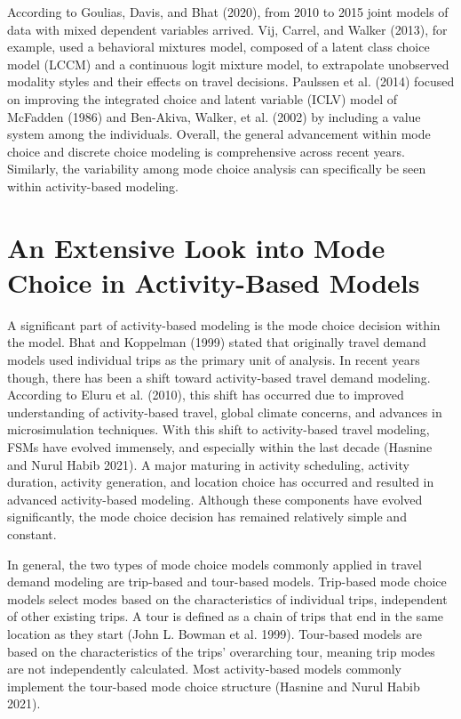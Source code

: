 \documentclass[12pt, oneside, openright]{byuthesis}
\begin{document}
According to Goulias, Davis, and Bhat (2020), from 2010 to 2015 joint models of data with mixed dependent variables arrived. Vij, Carrel, and Walker (2013), for example, used a behavioral mixtures model, composed of a latent class choice model (LCCM) and a continuous logit mixture model, to extrapolate unobserved modality styles and their effects on travel decisions. Paulssen et al. (2014) focused on improving the integrated choice and latent variable (ICLV) model of McFadden (1986) and Ben-Akiva, Walker, et al. (2002) by including a value system among the individuals. Overall, the general advancement within mode choice and discrete choice modeling is comprehensive across recent years. Similarly, the variability among mode choice analysis can specifically be seen within activity-based modeling.

\hypertarget{lit3}{%
\section{An Extensive Look into Mode Choice in Activity-Based Models}\label{lit3}}

A significant part of activity-based modeling is the mode choice decision within the model. Bhat and Koppelman (1999) stated that originally travel demand models used individual trips as the primary unit of analysis. In recent years though, there has been a shift toward activity-based travel demand modeling. According to Eluru et al. (2010), this shift has occurred due to improved understanding of activity-based travel, global climate concerns, and advances in microsimulation techniques. With this shift to activity-based travel modeling, FSMs have evolved immensely, and especially within the last decade (Hasnine and Nurul Habib 2021). A major maturing in activity scheduling, activity duration, activity generation, and location choice has occurred and resulted in advanced activity-based modeling. Although these components have evolved significantly, the mode choice decision has remained relatively simple and constant.

In general, the two types of mode choice models commonly applied in travel demand modeling are trip-based and tour-based models. Trip-based mode choice models select modes based on the characteristics of individual trips, independent of other existing trips. A tour is defined as a chain of trips that end in the same location as they start (John L. Bowman et al. 1999). Tour-based models are based on the characteristics of the trips' overarching tour, meaning trip modes are not independently calculated. Most activity-based models commonly implement the tour-based mode choice structure (Hasnine and Nurul Habib 2021).
\end{document}
